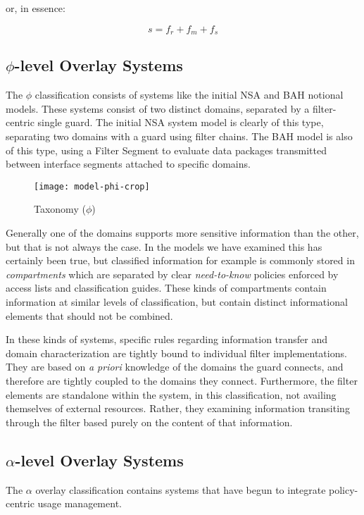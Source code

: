 or, in essence:

\label{equation:final}
\begin{equation}
s = f_{r} + f_{m} + f_{s}
\end{equation}

\subsection{$\phi$-level Overlay Systems}
The $\phi$ classification consists of systems like the initial NSA and BAH notional models.  These systems consist of two distinct domains, separated by a filter-centric single guard.  The initial NSA system model is clearly of this type, separating two domains with a guard using filter chains.  The BAH model is also of this type, using a Filter Segment to evaluate data packages transmitted between interface segments attached to specific domains.

\begin{figure}[!t]
\centering
\texttt{[image: model-phi-crop]}
\caption{Taxonomy ($\phi$)}
\label{fig:model:taxonomy-phi}
\end{figure}

Generally one of the domains supports more sensitive information than the other, but that is not always the case.  In the models we have examined this has certainly been true, but classified information for example  is commonly stored in \textit{compartments} which are separated by clear \textit{need-to-know} policies enforced by access lists and classification guides.  These kinds of compartments contain information at similar levels of classification, but contain distinct informational elements that should not be combined.

In these kinds of systems, specific rules regarding information transfer and domain characterization are tightly bound to individual filter implementations.  They are based on \textit{a priori} knowledge of the domains the guard connects, and therefore are tightly coupled to the domains they connect.  Furthermore, the filter elements are standalone within the system, in this classification, not availing themselves of external resources.  Rather, they examining information transiting through the filter based purely on the content of that information.

\subsection{$\alpha$-level Overlay Systems}
The $\alpha$ overlay classification contains systems that have begun to integrate policy-centric usage management.

